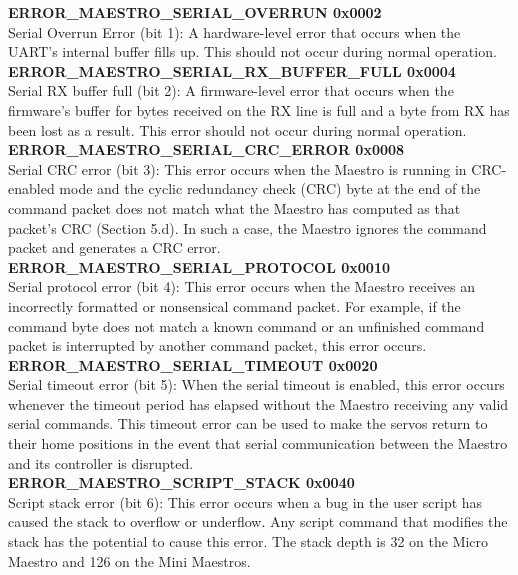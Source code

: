\documentclass[letterpaper]{book}
\begin{document}
\textbf{ERROR\_MAESTRO\_SERIAL\_OVERRUN 0x0002}\\
Serial Overrun Error (bit 1): A hardware-level error that occurs when the UART’s internal buffer fills up. This should not occur during normal operation.\\

\textbf{ERROR\_MAESTRO\_SERIAL\_RX\_BUFFER\_FULL 0x0004}\\
Serial RX buffer full (bit 2): A firmware-level error that occurs when the firmware’s buffer for bytes received on the RX line is full and a byte from RX has been lost as a result. This error should not occur during normal operation.\\

\textbf{ERROR\_MAESTRO\_SERIAL\_CRC\_ERROR 0x0008}\\
Serial CRC error (bit 3): This error occurs when the Maestro is running in CRC-enabled mode and the cyclic redundancy check (CRC) byte at the end of the command packet does not match what the Maestro has computed as that packet’s CRC (Section 5.d). In such a case, the Maestro ignores the command packet and generates a CRC error.\\

\textbf{ERROR\_MAESTRO\_SERIAL\_PROTOCOL 0x0010}\\
Serial protocol error (bit 4): This error occurs when the Maestro receives an incorrectly formatted or nonsensical command packet. For example, if the command byte does not match a known command or an unfinished command packet is interrupted by another command packet, this error occurs.\\

\textbf{ ERROR\_MAESTRO\_SERIAL\_TIMEOUT 0x0020}\\
Serial timeout error (bit 5): When the serial timeout is enabled, this error occurs whenever the timeout period has elapsed without the Maestro receiving any valid serial commands. This timeout error can be used to make the servos return to their home positions in the event that serial communication between the Maestro and its controller is disrupted.\\

\textbf{ ERROR\_MAESTRO\_SCRIPT\_STACK 0x0040}\\
Script stack error (bit 6): This error occurs when a bug in the user script has caused the stack to overflow or underflow. Any script command that modifies the stack has the potential to cause this error. The stack depth is 32 on the Micro Maestro and 126 on the Mini Maestros.\\
\end{document}
